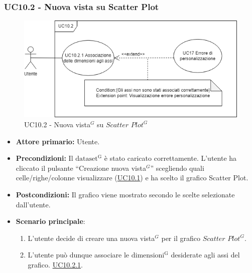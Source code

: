 
\subsubsection{UC10.2 - Nuova vista su Scatter Plot}
\label{sec:UC10.2}
\begin{figure}[H]
	\centering
	\includegraphics[scale=0.60]{../../assets/nuova_vista_scatter.png}
	\caption{UC10.2 - Nuova vista$^{G}$ su $Scatter$ $Plot^{G}$}
\end{figure}
\begin{itemize}
    \item \textbf{Attore primario:} Utente.
    \item \textbf{Precondizioni:} Il ${\mathrm{dataset^{G}}}$ è stato caricato correttamente. L'utente ha cliccato il pulsante ``Creazione nuova vista$^{G}$'' scegliendo quali celle/righe/colonne visualizzare (\hyperref[sec:UC10.1]{UC10.1}) e ha scelto il grafico Scatter Plot.
    \item \textbf{Postcondizioni:} Il grafico viene mostrato secondo le scelte selezionate dall'utente.
    \item \textbf{Scenario principale}:
    \begin{enumerate}
		\item L'utente decide di creare una nuova vista$^{G}$ per il grafico $Scatter$ $Plot^{G}$.
		\item L'utente può dunque associare le ${\mathrm{dimensioni^{G}}}$ desiderate agli assi del grafico. \hyperref[sec:UC10.2.1]{UC10.2.1}.
	\end{enumerate}
\end{itemize}


